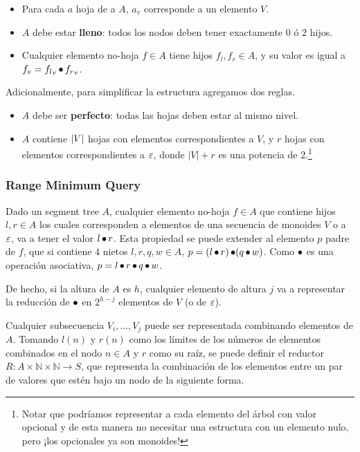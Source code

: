 \begin{itemize}
	\item Para cada \(a\) hoja de a \(A\), \(a_v\) corresponde a un elemento \(V\).
	\item \(A\) debe estar \textbf{lleno}: todos los nodos deben tener exactamente \(0\) ó \(2\) hijos.
	\item Cualquier elemento no-hoja \(f \in A\) tiene hijos \(f_l, f_r \in A\), y su valor es igual a \(f_v = {f_l}_v \operatorname{\bullet} {f_r}_v\).
\end{itemize}

Adicionalmente, para simplificar la estructura agregamos dos reglas.

\begin{itemize}
	\item \(A\) debe ser \textbf{perfecto}: todas las hojas deben estar al mismo nivel.
	\item \(A\) contiene \(\left|V\right|\) hojas con elementos correspondientes a \(V\), y \(r\) hojas con elementos correspondientes a \(\mathbf{\varepsilon}\), donde \(|V| + r\) es una potencia de 2.\footnote{Notar que podríamos representar a cada elemento del árbol con valor opcional y de esta manera no necesitar una estructura con un elemento nulo, pero ¡los opcionales ya son monoides!}
\end{itemize}

\subsubsection{Range Minimum Query}

Dado un segment tree \(A\), cualquier elemento no-hoja \(f \in A\) que contiene hijos \(l, r \in A\) los cuales corresponden a elementos de una secuencia de monoides \(V\) o a \(\mathbf{\varepsilon}\), va a tener el valor \(l \operatorname{\bullet} r\). Esta propiedad se puede extender al elemento \(p\) padre de \(f\), que si contiene \(4\) nietos \(l, r, q, w \in A\), \(p = (l \operatorname{\bullet} r) \operatorname{\bullet} (q \operatorname{\bullet} w)\). Como \(\operatorname{\bullet}\) es una operación asociativa, \(p = l \operatorname{\bullet} r \operatorname{\bullet} q \operatorname{\bullet} w\).

De hecho, si la altura de \(A\) es \(h\), cualquier elemento de altura \(j\) va a representar la reducción de \(\operatorname{\bullet}\) en \(2^{h - j}\) elementos de \(V\) (o de \(\mathbf{\varepsilon}\)).

Cualquier subsecuencia \(V_i, \dots, V_j\) puede ser representada combinando elementos de \(A\). Tomando \(l(n)\) y \(r(n)\) como los límites de los números de elementos combinados en el nodo \(n \in A\) y \(r\) como su raíz, se puede definir el reductor \(R : A \times \mathbb{N} \times \mathbb{N} \rightarrow S\), que representa la combinación de los elementos entre un par de valores que estén bajo un nodo de la siguiente forma.

